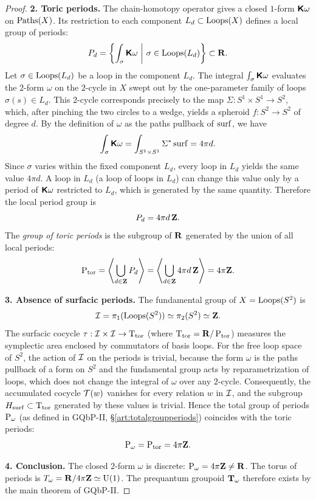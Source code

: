 \documentclass[11pt,reqno,letterpaper,twoside]{amsart}
\renewcommand{\TT}{\Groupoid{T}}
\begin{document}
\begin{proof}
    \medskip
    \noindent\textbf{2.  Toric periods.}
    The chain-homotopy operator gives a closed $1$-form $\boldsymbol{\mathsf{K}}\omega$ on $\operatorname{Paths}(X)$.
    Its restriction to each component $L_{d} \subset \operatorname{Loops}(X)$ defines a local group of periods:
    \[
      P_{d} = \left\{ \int_{\sigma} \boldsymbol{\mathsf{K}}\omega \ \middle| \ \sigma \in \operatorname{Loops}(L_{d}) \right\} \subset {\mathbf{R}}.
      \]
    Let $\sigma \in \operatorname{Loops}(L_{d})$ be a loop in the component $L_{d}$.
    The integral $\int_{\sigma} \boldsymbol{\mathsf{K}}\omega$ evaluates the $2$-form $\omega$ on the $2$-cycle in $X$
    swept out by the one-parameter family of loops $\sigma(s) \in L_{d}$.
    This $2$-cycle corresponds precisely to the map $\Sigma : S^{1} \times S^{1} \to S^{2}$,
    which, after pinching the two circles to a wedge, yields a spheroid $f : S^{2} \to S^{2}$
    of degree $d$.
    By the definition of $\omega$ as the paths pullback of $\operatorname{surf}$, we have
    \[
      \int_{\sigma} \boldsymbol{\mathsf{K}}\omega = \int_{S^{1} \times S^{1}} \Sigma^{*}\operatorname{surf} = 4\pi d.
      \]
    Since $\sigma$ varies within the fixed component $L_{d}$, every loop in $L_{d}$ yields the
    same value $4\pi d$.  A loop in $L_{d}$ (a loop of loops in $L_{d}$) can change this value
    only by a period of $\boldsymbol{\mathsf{K}}\omega$ restricted to $L_{d}$, which is generated by the same
    quantity.  Therefore the local period group is
    \[
      P_{d} = 4\pi d \, {\mathbf{Z}}.
      \]
    The \emph{group of toric periods} is the subgroup of ${\mathbf{R}}$ generated by the union of all
    local periods:
    \[
      \operatorname{P}_{\mathrm{tor}} = \left\langle \bigcup_{d \in {\mathbf{Z}}} P_{d} \right\rangle
      = \left\langle \bigcup_{d \in {\mathbf{Z}}} 4\pi d \, {\mathbf{Z}} \right\rangle
      = 4\pi {\mathbf{Z}}.
      \]
    
    \medskip
    \noindent\textbf{3.  Absence of surfacic periods.}
    The fundamental group of $X = \operatorname{Loops}(S^{2})$ is
    \[
      \mathcal{I} = \pi_{1}(\operatorname{Loops}(S^{2})) \simeq \pi_{2}(S^{2}) \simeq {\mathbf{Z}}.
      \]
    The surfacic cocycle $\tau : \mathcal{I} \times \mathcal{I} \to \mathrm{T}_{\mathrm{tor}}$ (where $\mathrm{T}_{\mathrm{tor}} = {\mathbf{R}}/\operatorname{P}_{\mathrm{tor}}$)
    measures the symplectic area enclosed by commutators of basis loops.
    For the free loop space of $S^{2}$, the action of $\mathcal{I}$ on the periods is trivial,
    because the form $\omega$ is the paths pullback of a form on $S^{2}$ and the fundamental
    group acts by reparametrization of loops, which does not change the integral of $\omega$
    over any $2$-cycle.  Consequently, the accumulated cocycle $\mathcal{T}(w)$ vanishes for every
    relation $w$ in $\mathcal{I}$, and the subgroup $H_{\operatorname{surf}} \subset \mathrm{T}_{\mathrm{tor}}$ generated by these
    values is trivial.  Hence the total group of periods $\operatorname{P}_\omega$ (as defined in GQbP-II, \S\ref{art:totalgroupperiods}) coincides with the toric periods:
    \[
      \operatorname{P}_\omega = \operatorname{P}_{\mathrm{tor}} = 4\pi {\mathbf{Z}}.
      \]
    
    \medskip
    \noindent\textbf{4.  Conclusion.}
    The closed $2$-form $\omega$ is discrete: $\operatorname{P}_\omega = 4\pi {\mathbf{Z}} \neq {\mathbf{R}}$.
    The torus of periods is $T_{\omega} = {\mathbf{R}} / 4\pi {\mathbf{Z}} \simeq \mathrm{U}(1)$.
    The prequantum groupoid $\TT_{\omega}$ therefore exists by the main theorem of GQbP-II.
  \end{proof}
  
\end{document}
